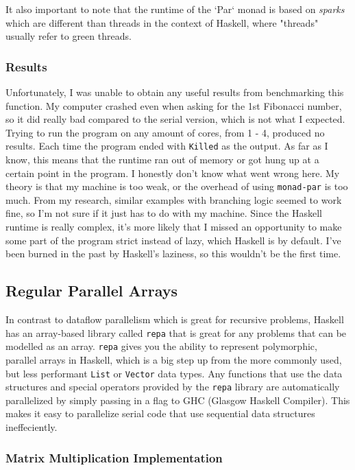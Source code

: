 \documentclass[a4paper, 10pt]{article}
\begin{document}
It also important to note that the runtime of the `Par` monad is based on \textit{sparks} which are different than threads in the context of Haskell, where "threads" usually refer to green threads.

\subsubsection{Results}

Unfortunately, I was unable to obtain any useful results from benchmarking this function. My computer crashed even when asking for the 1st Fibonacci number, so it did really bad compared to the serial version, which is not what I expected. Trying to run the program on any amount of cores, from 1 - 4, produced no results. Each time the program ended with \lstinline{Killed} as the output. As far as I know, this means that the runtime ran out of memory or got hung up at a certain point in the program. I honestly don't know what went wrong here. My theory is that my machine is too weak, or the overhead of using \lstinline{monad-par} is too much. From my research, similar examples with branching logic seemed to work fine, so I'm not sure if it just has to do with my machine. Since the Haskell runtime is really complex, it's more likely that I missed an opportunity to make some part of the program strict instead of lazy, which Haskell is by default. I've been burned in the past by Haskell's laziness, so this wouldn't be the first time.

\subsection{Regular Parallel Arrays}

In contrast to dataflow parallelism which is great for recursive problems, Haskell has an array-based library called \lstinline{repa} that is great for any problems that can be modelled as an array. \lstinline{repa} gives you the ability to represent polymorphic, parallel arrays in Haskell, which is a big step up from the more commonly used, but less performant \lstinline{List} or \lstinline{Vector} data types. Any functions that use the data structures and special operators provided by the  \lstinline{repa} library are automatically parallelized by simply passing in a flag to GHC (Glasgow Haskell Compiler). This makes it easy to parallelize serial code that use sequential data structures ineffeciently.

\subsubsection{Matrix Multiplication Implementation}
\end{document}
